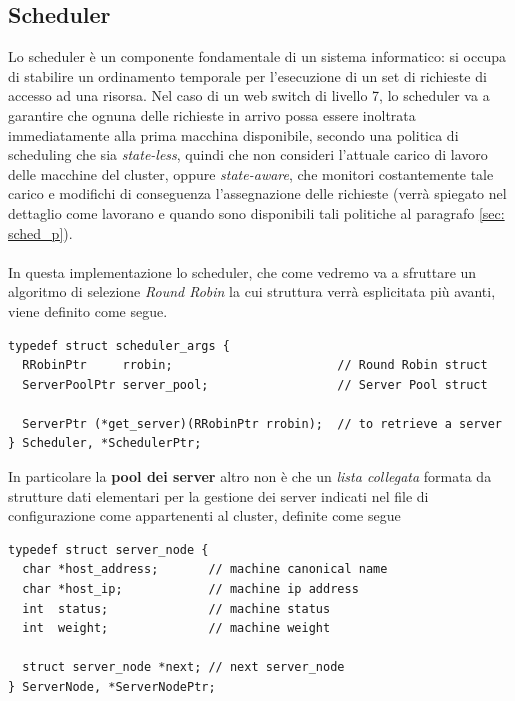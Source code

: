 \documentclass[italian]{tktltiki2}
\begin{document}
\subsection{Scheduler}
\label{ssec: sched}
Lo scheduler è un componente fondamentale di un sistema informatico: si occupa di stabilire un ordinamento temporale per l'esecuzione di un set di richieste di accesso ad una risorsa. Nel caso di un web switch di livello 7, lo scheduler va a garantire che ognuna delle richieste in arrivo possa essere inoltrata immediatamente alla prima macchina disponibile, secondo una politica di scheduling che sia \emph{state-less}, quindi che non consideri l'attuale carico di lavoro delle macchine del cluster, oppure \emph{state-aware}, che monitori costantemente tale carico e modifichi di conseguenza l'assegnazione delle richieste (verrà spiegato nel dettaglio come lavorano e quando sono disponibili tali politiche al paragrafo \ref{sec: sched_p}). \\\\
In questa implementazione lo scheduler, che come vedremo va a sfruttare un algoritmo di selezione \emph{Round Robin} la cui struttura verrà esplicitata più avanti, viene definito come segue.
\begin{lstlisting}
typedef struct scheduler_args {
  RRobinPtr     rrobin;                       // Round Robin struct
  ServerPoolPtr server_pool;                  // Server Pool struct

  ServerPtr (*get_server)(RRobinPtr rrobin);  // to retrieve a server
} Scheduler, *SchedulerPtr;
\end{lstlisting}
In particolare la \textbf{pool dei server} altro non è che un \emph{lista collegata} formata da strutture dati elementari per la gestione dei server indicati nel file di configurazione come appartenenti al cluster, definite come segue
\begin{lstlisting}
typedef struct server_node {
  char *host_address;       // machine canonical name
  char *host_ip;            // machine ip address
  int  status;              // machine status
  int  weight;              // machine weight

  struct server_node *next; // next server_node
} ServerNode, *ServerNodePtr;
\end{lstlisting}
\end{document}
